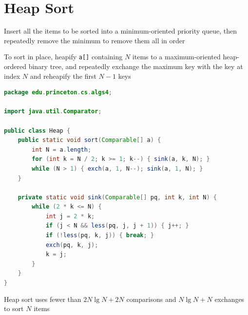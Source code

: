 \documentclass[8pt,a4paper,compress]{beamer}
\begin{document}
\section{Heap Sort}
\begin{frame}[fragile]
\pause

Insert all the items to be sorted into a minimum-oriented priority queue, then repeatedly remove the minimum to remove them all in order

\pause
\bigskip

To sort in place, heapify \lstinline$a[]$ containing $N$ items to a maximum-oriented heap-ordered binary tree, and repeatedly exchange the maximum key with the key at index $N$ and reheapify the first $N - 1$ keys 

\pause

\begin{lstlisting}[language=Java]
package edu.princeton.cs.algs4;

import java.util.Comparator;

public class Heap {
    public static void sort(Comparable[] a) {
        int N = a.length;
        for (int k = N / 2; k >= 1; k--) { sink(a, k, N); }
        while (N > 1) { exch(a, 1, N--); sink(a, 1, N); }
    }
    
    private static void sink(Comparable[] pq, int k, int N) {
        while (2 * k <= N) {
            int j = 2 * k;
            if (j < N && less(pq, j, j + 1)) { j++; }
            if (!less(pq, k, j)) { break; }
            exch(pq, k, j);
            k = j;
        }
    }
}
\end{lstlisting}

\pause
\bigskip

Heap sort uses fewer than $2N \lg N + 2N$ comparisons and $N\lg N + N$ exchanges to sort $N$ items
\end{frame}
\end{document}
